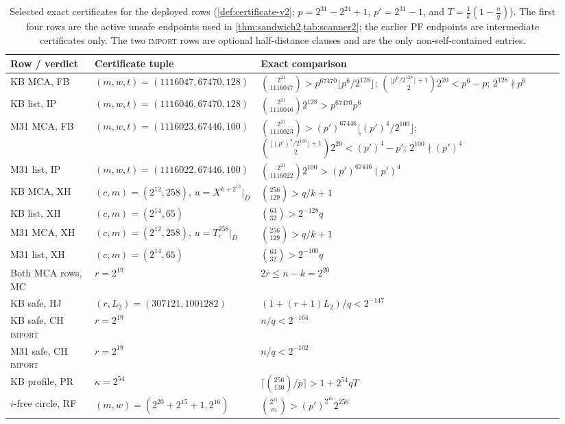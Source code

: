 \documentclass[11pt]{article}
\theoremstyle{definition}
\theoremstyle{remark}
\begin{document}
\begin{table}[ht]
\centering
\scriptsize
\setlength{\tabcolsep}{3pt}
\begin{tabular}{@{}p{0.15\linewidth}p{0.25\linewidth}p{0.54\linewidth}@{}}
\toprule
Row / verdict & Certificate tuple & Exact comparison \\
\midrule
KB MCA, FB & $(m,w,t)=(1116047,67470,128)$ & $\binom{2^{21}}{1116047}>p^{67470}\lfloor p^6/2^{128}\rfloor$; $\binom{\lfloor p^6/2^{128}\rfloor+1}{2}2^{20}<p^6-p$; $2^{128}\nmid p^6$ \\
KB list, IP & $(m,w,t)=(1116046,67470,128)$ & $\binom{2^{21}}{1116046}2^{128}>p^{67470}p^6$ \\
M31 MCA, FB & $(m,w,t)=(1116023,67446,100)$ & $\binom{2^{21}}{1116023}>(p')^{67446}\lfloor(p')^4/2^{100}\rfloor$; $\binom{\lfloor(p')^4/2^{100}\rfloor+1}{2}2^{20}<(p')^4-p'$; $2^{100}\nmid(p')^4$ \\
M31 list, IP & $(m,w,t)=(1116022,67446,100)$ & $\binom{2^{21}}{1116022}2^{100}>(p')^{67446}(p')^4$ \\
KB MCA, XH & $(c,m)=(2^{12},258)$, $u=X^{k+2^{13}}|_D$ & $\binom{256}{129}>q/k+1$ \\
KB list, XH & $(c,m)=(2^{14},65)$ & $\binom{63}{32}>2^{-128}q$ \\
M31 MCA, XH & $(c,m)=(2^{12},258)$, $u=T_c^{258}|_D$ & $\binom{256}{129}>q/k+1$ \\
M31 list, XH & $(c,m)=(2^{14},65)$ & $\binom{63}{32}>2^{-100}q$ \\
Both MCA rows, MC & $r=2^{19}$ & $2r\le n-k=2^{20}$ \\
KB safe, HJ & $(r,L_2)=(307121,1001282)$ & $(1+(r+1)L_2)/q<2^{-147}$ \\
KB safe, CH \textsc{import} & $r=2^{19}$ & $n/q<2^{-164}$ \\
M31 safe, CH \textsc{import} & $r=2^{19}$ & $n/q<2^{-102}$ \\
KB profile, PR & $\kappa=2^{54}$ & $\lceil\binom{256}{130}/p\rceil>1+2^{54}qT$ \\
$i$-free circle, RF & $(m,w)=(2^{20}+2^{15}+1,2^{16})$ & $\binom{2^{21}}m>(p')^{2^{16}}2^{256}$ \\
\bottomrule
\end{tabular}
\caption{Selected exact certificates for the deployed rows (\cref{def:certificate-v2}; $p=2^{31}-2^{24}+1$, $p'=2^{31}-1$, and $T=\frac1k(1-\frac nq)$).  The first four rows are the active unsafe endpoints used in \cref{thm:sandwich2,tab:scanner2}; the earlier PF endpoints are intermediate certificates only.  The two \textsc{import} rows are optional half-distance clauses and are the only non-self-contained entries.}
\label{tab:certs}
\end{table}
\end{document}
